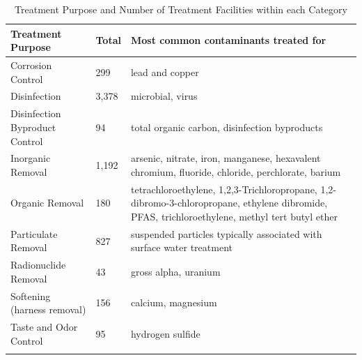 \begin{table}[]
\begin{tabular}{|l|l|l|}
\hline
Treatment   Purpose                & Total & Most   common   contaminants   treated   for                                                                                                                          \\ \hline
Corrosion   Control                & 299   & lead   and   copper                                                                                                                                                   \\ \hline
Disinfection                       & 3,378 & microbial,   virus                                                                                                                                                    \\ \hline
Disinfection   Byproduct   Control & 94    & total   organic   carbon,   disinfection   byproducts                                                                                                                 \\ \hline
Inorganic Removal                  & 1,192 & arsenic,   nitrate,   iron,   manganese,   hexavalent   chromium,   fluoride,   chloride,   perchlorate,   barium                                                     \\ \hline
Organic   Removal                  & 180   & tetrachloroethylene,   1,2,3-Trichloropropane,   1,2-   dibromo-3-chloropropane,   ethylene   dibromide,   PFAS,   trichloroethylene,   methyl   tert   butyl   ether \\ \hline
Particulate   Removal              & 827   & suspended   particles   typically   associated   with surface   water   treatment                                                                                     \\ \hline
Radionuclide   Removal             & 43    & gross   alpha,   uranium                                                                                                                                              \\ \hline
Softening   (harness   removal)    & 156   & calcium,   magnesium                                                                                                                                                  \\ \hline
Taste   and   Odor   Control       & 95    & hydrogen   sulfide                                                                                                                                                    \\ \hline
                                   &       &                                                                                                                                                                       \\ \hline
\end{tabular}
\caption{Treatment Purpose and Number of Treatment Facilities within each Category}
\end{table}


